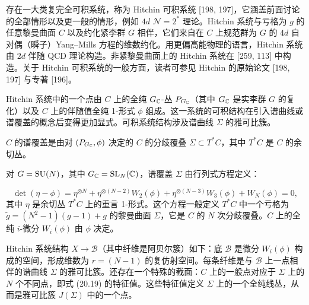 存在一大类复完全可积系统，称为 Hitchin 可积系统 [198, 197]，它涵盖前面讨论的全部情形以及更一般的情形，例如 $4d$ $\mathcal{N}=2^*$ 理论。Hitchin 系统与亏格为 $g$ 的任意黎曼曲面 $C$ 以及约化紧李群 $G$ 相伴，它们来自在 $C$ 上规范群为 $G$ 的 $4d$ 自对偶（瞬子）Yang–Mills 方程的维数约化。用更偏高能物理的语言，Hitchin 系统由 $2d$ 伴随 QCD 理论构造。非紧黎曼曲面上的 Hitchin 系统在 [259, 113] 中构造。关于 Hitchin 可积系统的一般方面，读者可参见 Hitchin 的原始论文 [198, 197] 与专著 [196]。

Hitchin 系统中的一个点由 $C$ 上的全纯 $G_{\mathbb{C}}$-丛 $P_{G_{\mathbb{C}}}$（其中 $G_{\mathbb{C}}$ 是实李群 $G$ 的复化）以及 $C$ 上的伴随值全纯 1-形式 $\phi$ 组成。这一系统的可积结构在引入谱曲线或谱覆盖的概念后变得更加显式。可积系统结构涉及谱曲线 $\Sigma$ 的雅可比簇。

\begin{definition}[20.39]
$C$ 的谱覆盖是由对 $(P_{G_{\mathbb{C}}},\phi)$ 决定的 $C$ 的分歧覆叠 $\Sigma\subset T^*C$，其中 $T^*C$ 是 $C$ 的余切丛。
\end{definition}

对 $G=\operatorname{SU}(N)$，其中 $G_{\mathbb{C}}=\operatorname{SL}_N(\mathbb{C})$，谱覆盖 $\Sigma$ 由行列式方程定义：

\begin{equation}
\det(\eta-\phi)=\eta^{\otimes N}+\eta^{\otimes(N-2)}W_2(\phi)+\eta^{\otimes(N-3)}W_3(\phi)+W_N(\phi)=0,\tag{20.19}
\end{equation}
其中 $\eta$ 是余切丛 $T^*C$ 上的重言 1-形式。这个方程一般定义 $T^*C$ 中一个亏格为 $\tilde{g}=(N^2-1)(g-1)+g$ 的黎曼曲面 $\Sigma$，它是 $C$ 的 $N$ 次分歧覆叠。$C$ 上的全纯 $i$-微分 $W_i(\phi)$ 由 $\phi$ 决定。

Hitchin 系统结构 $X\to\mathcal{B}$（其中纤维是阿贝尔簇）如下：底 $\mathcal{B}$ 是微分 $W_i(\phi)$ 构成的空间，形成维数为 $r=(N-1)$ 的复仿射空间。每条纤维是与 $\mathcal{B}$ 上一点相伴的谱曲线 $\Sigma$ 的雅可比簇。还存在一个特殊的截面：$C$ 上的一般点对应于 $\Sigma$ 上的 $N$ 个不同点，即式 (20.19) 的特征值。这些特征值定义 $\Sigma$ 上的一个全纯线丛，从而是雅可比簇 $J(\Sigma)$ 中的一个点。


